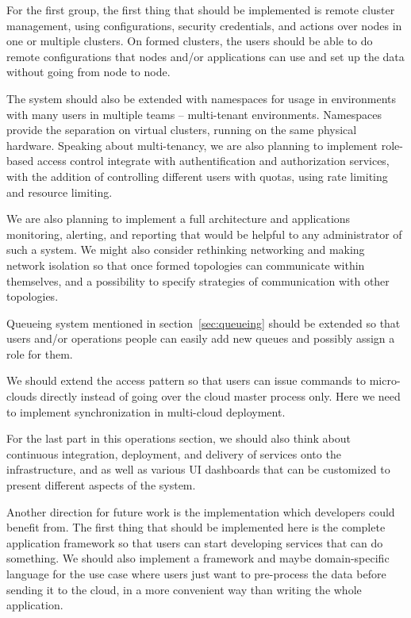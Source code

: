 \noindent
For the first group, the first thing that should be implemented is remote cluster management, using configurations, security credentials, and actions over nodes in one or multiple clusters. On formed clusters, the users should be able to do remote configurations that nodes and/or applications can use and set up the data without going from node to node.

The system should also be extended with namespaces for usage in environments with many users in multiple teams -- multi-tenant environments. Namespaces provide the separation on virtual clusters, running on the same physical hardware. Speaking about multi-tenancy, we are also planning to implement role-based access control integrate with authentification and authorization services, with the addition of controlling different users with quotas, using rate limiting and resource limiting.

We are also planning to implement a full architecture and applications monitoring, alerting, and reporting that would be helpful to any administrator of such a system. We might also consider rethinking networking and making network isolation so that once formed topologies can communicate within themselves, and a possibility to specify 
strategies of communication with other topologies.

Queueing system mentioned in section~\ref{sec:queueing} should be extended so that users and/or operations people can easily add new queues and possibly assign a role for them.

We should extend the access pattern so that users can issue commands to micro-clouds directly instead of going over the cloud master process only. Here we need to implement synchronization in multi-cloud deployment.

For the last part in this operations section, we should also think about continuous integration, deployment, and delivery of services onto the infrastructure, and as well as various UI dashboards that can be customized to present different aspects of the system.

Another direction for future work is the implementation which developers could benefit from. The first thing that should be implemented here is the complete application framework so that users can start developing services that can do something. We should also implement a framework and maybe domain-specific language for the use case where users just want to pre-process the data before sending it to the cloud, in a more convenient way than writing the whole application.

